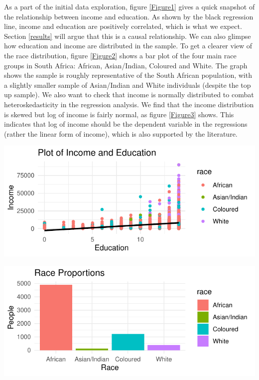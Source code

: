 \documentclass[11pt,preprint, authoryear]{elsarticle}
\let\origfigure\figure
\let\endorigfigure\endfigure
\renewenvironment{figure}[1][2] {
    \expandafter\origfigure\expandafter[H]
} {
    \endorigfigure
}
\numberwithin{equation}{section}
\numberwithin{figure}{section}
\numberwithin{table}{section}
\begin{document}
As a part of the initial data exploration, figure \ref{Figure1} gives a
quick snapshot of the relationship between income and education. As
shown by the black regression line, income and education are positively
correlated, which is what we expect. Section \ref{results} will argue
that this is a causal relationship. We can also glimpse how education
and income are distributed in the sample. To get a clearer view of the
race distribution, figure \ref{Figure2} shows a bar plot of the four
main race groups in South Africa: African, Asian/Indian, Coloured and
White. The graph shows the sample is roughly representative of the South
African population, with a slightly smaller sample of Asian/Indian and
White individuals (despite the top up sample). We also want to check
that income is normally distributed to combat heteroskedasticity in the
regression analysis. We find that the income distribution is skewed but
log of income is fairly normal, as figure \ref{Figure3} shows. This
indicates that log of income should be the dependent variable in the
regressions (rather the linear form of income), which is also supported
by the literature.

\begin{figure}[H]

{\centering \includegraphics{20346212CSproj_files/figure-latex/lineargraph-1} 

}

\caption{Income and Education Relationship \label{Figure1}}\label{fig:lineargraph}
\end{figure}

\begin{figure}[H]

{\centering \includegraphics{20346212CSproj_files/figure-latex/racegraph-1} 

}

\caption{Race Proportions of Sample \label{Figure2}}\label{fig:racegraph}
\end{figure}
\end{document}
